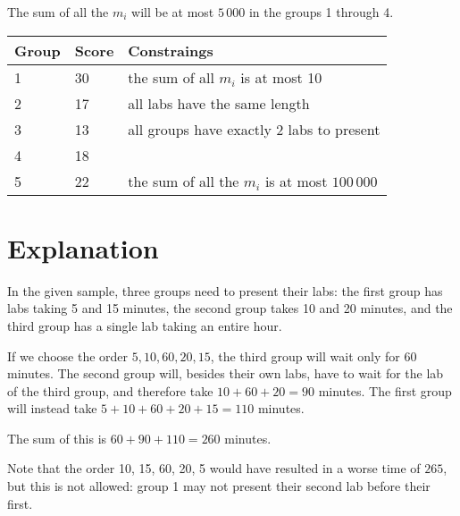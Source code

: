 The sum of all the $m_i$ will be at most $5\,000$ in the groups 1 through 4.

\begin{tabular}{| l | l | l |}
	\hline
	Group & Score & Constraings\\ \hline
  1     & 30         & the sum of all $m_i$ is at most 10 \\ \hline
  2     & 17         & all labs have the same length \\ \hline
  3     & 13         & all groups have exactly 2 labs to present \\ \hline
  4     & 18         & \\ \hline
  5     & 22         & the sum of all the $m_i$ is at most $100\,000$ \\ \hline
\end{tabular}

\section*{Explanation}
In the given sample, three groups need to present their labs: the first group has labs taking 5 and 15 minutes, the second group takes 10 and 20 minutes, and the third group has a single lab taking an entire hour.

If we choose the order $5, 10, 60, 20, 15$, the third group will wait only for 60 minutes.
The second group will, besides their own labs, have to wait for the lab of the third group, and therefore take $10+60+20 = 90$ minutes.
The first group will instead take $5 + 10 + 60 + 20 + 15 = 110$ minutes.

The sum of this is $60 + 90 + 110 = 260$ minutes.

Note that the order 10, 15, 60, 20, 5 would have resulted in a worse time of $265$, but this is not allowed: group 1 may not present their second lab before their first.
